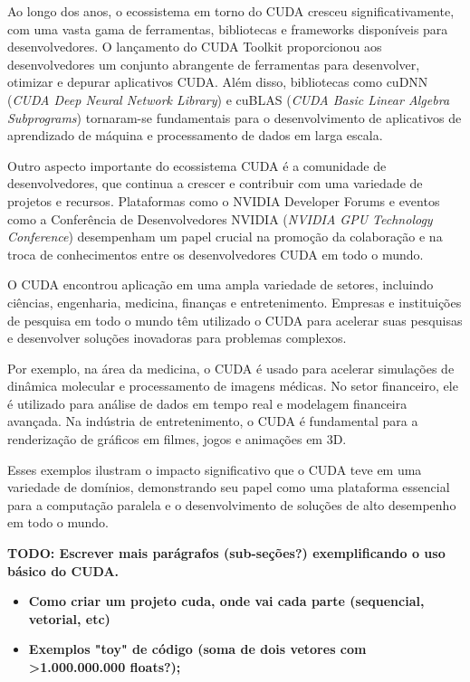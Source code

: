 \documentclass[12pt,
openright, 
oneside, %
a4paper,    %
brazil]{facom-ufu-abntex2}
\begin{document}
Ao longo dos anos, o ecossistema em torno do CUDA cresceu significativamente, com uma vasta gama de ferramentas, bibliotecas e frameworks disponíveis para desenvolvedores. O lançamento do CUDA Toolkit proporcionou aos desenvolvedores um conjunto abrangente de ferramentas para desenvolver, otimizar e depurar aplicativos CUDA. Além disso, bibliotecas como cuDNN (\textit{CUDA Deep Neural Network Library}) e cuBLAS (\textit{CUDA Basic Linear Algebra Subprograms}) tornaram-se fundamentais para o desenvolvimento de aplicativos de aprendizado de máquina e processamento de dados em larga escala.


Outro aspecto importante do ecossistema CUDA é a comunidade de desenvolvedores, que continua a crescer e contribuir com uma variedade de projetos e recursos. Plataformas como o NVIDIA Developer Forums e eventos como a Conferência de Desenvolvedores NVIDIA (\textit{NVIDIA GPU Technology Conference}) desempenham um papel crucial na promoção da colaboração e na troca de conhecimentos entre os desenvolvedores CUDA em todo o mundo.

O CUDA encontrou aplicação em uma ampla variedade de setores, incluindo ciências, engenharia, medicina, finanças e entretenimento. Empresas e instituições de pesquisa em todo o mundo têm utilizado o CUDA para acelerar suas pesquisas e desenvolver soluções inovadoras para problemas complexos.

Por exemplo, na área da medicina, o CUDA é usado para acelerar simulações de dinâmica molecular e processamento de imagens médicas. No setor financeiro, ele é utilizado para análise de dados em tempo real e modelagem financeira avançada. Na indústria de entretenimento, o CUDA é fundamental para a renderização de gráficos em filmes, jogos e animações em 3D.

Esses exemplos ilustram o impacto significativo que o CUDA teve em uma variedade de domínios, demonstrando seu papel como uma plataforma essencial para a computação paralela e o desenvolvimento de soluções de alto desempenho em todo o mundo.


\textbf{TODO: Escrever mais parágrafos (sub-seções?) exemplificando o uso básico do CUDA.}

\begin{itemize}
  \item \textbf{Como criar um projeto cuda, onde vai cada parte (sequencial, vetorial, etc)}
  \item \textbf{Exemplos "toy" de código (soma de dois vetores com >1.000.000.000 floats?);}
\end{itemize}
\end{document}
